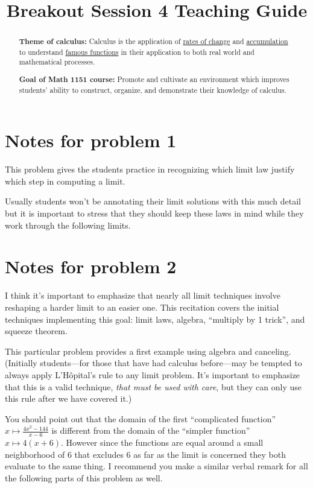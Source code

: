 \documentclass[nooutcomes]{ximera}
\title{Breakout Session 4 Teaching Guide}
\begin{document}
\begin{abstract}
 \textbf{Theme of calculus:} Calculus is the application of  \href{https://en.wikipedia.org/wiki/Derivative}{rates of change} and \href{https://en.wikipedia.org/wiki/Integral}{accumulation} to understand \href{https://en.wikipedia.org/wiki/Elementary_function}{famous functions} in their application to both real world and mathematical processes.

  \textbf{Goal of Math 1151 course:} Promote and cultivate an environment which improves students' ability to construct, organize, and demonstrate their knowledge of calculus.
\end{abstract}
\maketitle

\section{Notes for problem 1}
This problem gives the students practice in recognizing which limit law justify which step in computing a limit.

Usually students won't be annotating their limit solutions with this much detail but it is important to stress that they should keep these laws in mind while they work through the following limits.

\section{Notes for problem 2}
I think it's important to emphasize that nearly all limit techniques involve reshaping a harder limit to an easier one.
This recitation covers the initial techniques implementing this goal: limit laws, algebra, ``multiply by 1 trick'', and squeeze theorem.

This particular problem provides a first example using algebra and canceling.
(Initially students---for those that have had calculus before---may be tempted to always apply L'H\^{o}pital's rule to any limit problem.
It's important to emphasize that this is a valid technique, \emph{that must be used with care}, but they can only use this rule after we have covered it.)

You should point out that the domain of the first ``complicated function'' $x \mapsto \frac{4x^2 - 144}{x-6}$ is different from the domain of the ``simpler function'' $x \mapsto 4(x+6)$.
However since the functions are equal around a small neighborhood of $6$ that excludes $6$ as far as the limit is concerned they both evaluate to the same thing.
I recommend you make a similar verbal remark for all the following parts of this problem as well.
\end{document}

